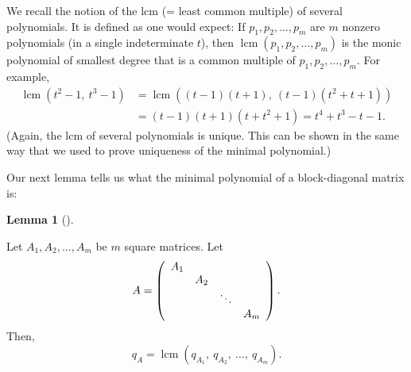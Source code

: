 \documentclass[numbers=enddot,12pt,final,onecolumn,notitlepage]{scrartcl}%
\numberwithin{exer}{subsection}
\theoremstyle{definition}
\newtheorem{lem}[theo]{Lemma}
\newenvironment{lemma}[1][]
{\begin{lem}[#1]\begin{leftbar}}
{\end{leftbar}\end{lem}}
\begin{document}
We recall the notion of the lcm (= least common multiple) of several
polynomials. It is defined as one would expect: If $p_{1},p_{2},\ldots,p_{m}$
are $m$ nonzero polynomials (in a single indeterminate $t$), then
$\operatorname{lcm}\left(  p_{1},p_{2},\ldots,p_{m}\right)  $ is the monic
polynomial of smallest degree that is a common multiple of $p_{1},p_{2}%
,\ldots,p_{m}$. For example,%
\begin{align*}
\operatorname{lcm}\left(  t^{2}-1,\ t^{3}-1\right)   &  =\operatorname{lcm}%
\left(  \left(  t-1\right)  \left(  t+1\right)  ,\ \left(  t-1\right)  \left(
t^{2}+t+1\right)  \right) \\
&  =\left(  t-1\right)  \left(  t+1\right)  \left(  t+t^{2}+1\right)
=t^{4}+t^{3}-t-1.
\end{align*}
(Again, the lcm of several polynomials is unique. This can be shown in the
same way that we used to prove uniqueness of the minimal polynomial.)

Our next lemma tells us what the minimal polynomial of a block-diagonal matrix is:

\begin{lemma}
\label{lem.jnf.mipo.block-diag}Let $A_{1},A_{2},\ldots,A_{m}$ be $m$ square
matrices. Let%
\[
A=\left(
\begin{array}
[c]{cccc}%
A_{1} &  &  & \\
& A_{2} &  & \\
&  & \ddots & \\
&  &  & A_{m}%
\end{array}
\right)  .
\]
Then,%
\[
q_{A}=\operatorname{lcm}\left(  q_{A_{1}},\ q_{A_{2}},\ \ldots,\ q_{A_{m}%
}\right)  .
\]

\end{lemma}
\end{document}
